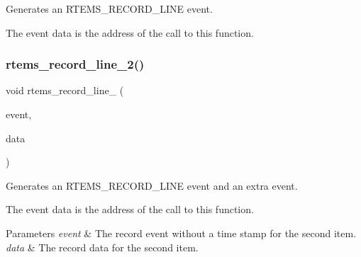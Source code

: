 Generates an R\+T\+E\+M\+S\+\_\+\+R\+E\+C\+O\+R\+D\+\_\+\+L\+I\+NE event. 

The event data is the address of the call to this function. \mbox{\label{group__RTEMSRecord_ga6f9cb236fa4ba2fa458eea2ec433952b}} 
\subsubsection{\texorpdfstring{rtems\_record\_line\_2()}{rtems\_record\_line\_2()}}
{\footnotesize\ttfamily void rtems\+\_\+record\+\_\+line\+\_ (\begin{DoxyParamCaption}\item[{\mbox{\hyperlink{group__RTEMSRecord_gac748f47c13acd7d0595694ed7f19074b}{rtems\+\_\+record\+\_\+event}}}]{event,  }\item[{\mbox{\hyperlink{group__RTEMSRecord_gab483bd3ec735835dac6788b78c817eab}{rtems\+\_\+record\+\_\+data}}}]{data }\end{DoxyParamCaption})}



Generates an R\+T\+E\+M\+S\+\_\+\+R\+E\+C\+O\+R\+D\+\_\+\+L\+I\+NE event and an extra event. 

The event data is the address of the call to this function.


\begin{DoxyParams}{Parameters}
{\em event} & The record event without a time stamp for the second item. \\
\hline
{\em data} & The record data for the second item. \\
\hline
\end{DoxyParams}
\mbox{\label{group__RTEMSRecord_gaf7ef62ae9e2ff1e27c7b1d2a0bcfcc6e}} 
